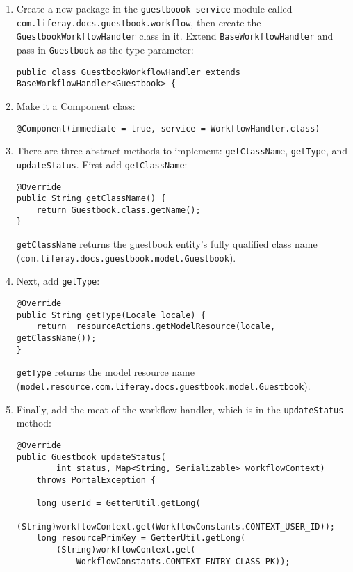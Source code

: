 \begin{enumerate}
\def\labelenumi{\arabic{enumi}.}
\item
  Create a new package in the \texttt{guestboook-service} module called
  \texttt{com.liferay.docs.guestbook.workflow}, then create the
  \texttt{GuestbookWorkflowHandler} class in it. Extend
  \texttt{BaseWorkflowHandler} and pass in \texttt{Guestbook} as the
  type parameter:

\begin{verbatim}
public class GuestbookWorkflowHandler extends BaseWorkflowHandler<Guestbook> {
\end{verbatim}
\item
  Make it a Component class:

\begin{verbatim}
@Component(immediate = true, service = WorkflowHandler.class)
\end{verbatim}
\item
  There are three abstract methods to implement: \texttt{getClassName},
  \texttt{getType}, and \texttt{updateStatus}. First add
  \texttt{getClassName}:

\begin{verbatim}
@Override
public String getClassName() {
    return Guestbook.class.getName();
}
\end{verbatim}

  \texttt{getClassName} returns the guestbook entity's fully qualified
  class name (\texttt{com.liferay.docs.guestbook.model.Guestbook}).
\item
  Next, add \texttt{getType}:

\begin{verbatim}
@Override
public String getType(Locale locale) {
    return _resourceActions.getModelResource(locale, getClassName());
}
\end{verbatim}

  \texttt{getType} returns the model resource name
  (\texttt{model.resource.com.liferay.docs.guestbook.model.Guestbook}).
\item
  Finally, add the meat of the workflow handler, which is in the
  \texttt{updateStatus} method:

\begin{verbatim}
@Override
public Guestbook updateStatus(
        int status, Map<String, Serializable> workflowContext)
    throws PortalException {

    long userId = GetterUtil.getLong(
        (String)workflowContext.get(WorkflowConstants.CONTEXT_USER_ID));
    long resourcePrimKey = GetterUtil.getLong(
        (String)workflowContext.get(
            WorkflowConstants.CONTEXT_ENTRY_CLASS_PK));


\end{verbatim}
\end{enumerate}
